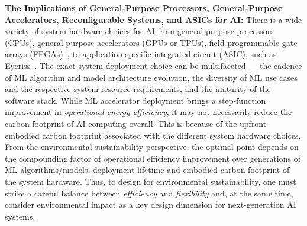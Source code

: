 \textbf{The Implications of General-Purpose Processors, General-Purpose Accelerators, Reconfigurable Systems, and ASICs for AI:} 
There is a wide variety of system hardware choices for AI from general-purpose processors (CPUs), general-purpose accelerators (GPUs or TPUs), field-programmable gate arrays (FPGAs)~\cite{Putnam:ieee-micro-2015}, to application-specific integrated circuit (ASIC), such as Eyeriss~\cite{7551407}. 
The exact system deployment choice can be multifaceted --- 
the cadence of ML algorithm and model architecture evolution, the diversity of ML use cases and the respective system resource requirements, and the maturity of the software stack. 
While ML accelerator deployment brings a step-function improvement in \textit{operational energy efficiency}, it may not necessarily reduce the carbon footprint of AI computing overall. This is because of the upfront embodied carbon footprint associated with the different system hardware choices. 
From the environmental sustainability perspective, the optimal point depends on the compounding factor of operational efficiency improvement over generations of ML algorithms/models, deployment lifetime and embodied carbon footprint of the system hardware. Thus, to design for environmental sustainability, one must strike a careful balance between \textit{efficiency} and \textit{flexibility} and, at the same time, consider environmental impact as a key design dimension for next-generation AI systems.




